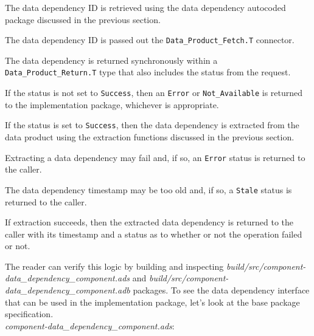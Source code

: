 \vspace{5mm} %
\begin{spacedenumerate}
  \item The data dependency ID is retrieved using the data dependency autocoded package discussed in the previous section.
  \item The data dependency ID is passed out the \texttt{Data\_Product\_Fetch.T} connector.
  \item The data dependency is returned synchronously within a \texttt{Data\_Product\_Return.T} type that also includes the status from the request.
  \item If the status is not set to \texttt{Success}, then an \texttt{Error} or \texttt{Not\_Available} is returned to the implementation package, whichever is appropriate.
  \item If the status is set to \texttt{Success}, then the data dependency is extracted from the data product using the extraction functions discussed in the previous section.
  \item Extracting a data dependency may fail and, if so, an \texttt{Error} status is returned to the caller.
  \item The data dependency timestamp may be too old and, if so, a \texttt{Stale} status is returned to the caller.
  \item If extraction succeeds, then the extracted data dependency is returned to the caller with its timestamp and a status as to whether or not the operation failed or not.
\end{spacedenumerate}
\vspace{5mm} %

The reader can verify this logic by building and inspecting \textit{build/src/component-data\_dependency\_component.ads} and \textit{build/src/component-data\_dependency\_component.adb} packages. To see the data dependency interface that can be used in the implementation package, let's look at the base package specification. \\

\textit{component-data\_dependency\_component.ads}:


